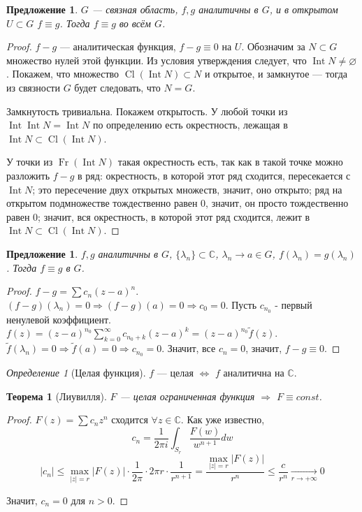 \documentclass[12pt]{article}
\renewcommand{\C}{\mathbb{C}}
\newcommand{\Int}{\operatorname{Int}}
\newcommand{\Cl}{\operatorname{Cl}}
\newcommand{\Fr}{\operatorname{Fr}}
\newcommand{\Ra}{\Rightarrow}
\renewcommand{\iff}{\Leftrightarrow}
\newcounter{cnt}
\theoremstyle{thmnote}
\newtheorem{theorem}[cnt]{Теорема}
\newtheorem{proposition}[cnt]{Предложение}
\theoremstyle{remark}
\theoremstyle{defnote}
\newtheorem{definition}[cnt]{Определение}
\begin{document}
\begin{proposition}
\label{nodensezeros}
    $G$ --- связная область, $f, g$ аналитичны в $G$, и в открытом $U \subset G$ $f \equiv g$. Тогда $f \equiv g$ во всём $G$.
\end{proposition}
\begin{proof}
    $f - g$ --- аналитическая функция, $f - g \equiv 0$ на $U$. Обозначим за $N \subset G$ множество нулей этой функции. Из условия утверждения следует, что $\Int N \neq \varnothing$. Покажем, что множество $\Cl(\Int N) \subset N$ и открытое, и замкнутое --- тогда из связности $G$ будет следовать, что $N = G$.

    Замкнутость тривиальна. Покажем открытость. У любой точки из $\Int \Int N = \Int N$ по определению есть окрестность, лежащая в $\Int N \subset \Cl(\Int N)$.
    
    У точки из $\Fr (\Int N)$ такая окрестность есть, так как в такой точке можно разложить $f - g$ в ряд: окрестность, в которой этот ряд сходится, пересекается с $\Int N$; это пересечение двух открытых множеств, значит, оно открыто; ряд на открытом подмножестве тождественно равен 0, значит, он просто тождественно равен 0; значит, вся окрестность, в которой этот ряд сходится, лежит в $\Int N \subset \Cl(\Int N)$.
\end{proof}

\begin{proposition}
    $f, g$ аналитичны в $G$, $\{\lambda_n\} \subset \C$, $\lambda_n \longrightarrow a \in G$, $f(\lambda_n) = g(\lambda_n)$. Тогда $f \equiv g$ в $G$.
\end{proposition}
\begin{proof}
    $f - g = \sum c_n (z - a)^n$. $(f-g)(\lambda_n) = 0 \Ra (f-g)(a) = 0 \Ra c_0 = 0$. Пусть $c_{n_0}$ - первый ненулевой коэффициент. $f(z) = (z - a)^{n_0} \sum_{k = 0}^{\infty} c_{n_0 + k} (z - a)^k = (z - a)^{n_0} \tilde{f}(z)$. $\tilde{f}(\lambda_n) = 0 \Ra \tilde{f}(a) = 0 \Ra c_{n_0} = 0$. Значит, все $c_n = 0$, значит, $f - g \equiv 0$.
\end{proof}

\begin{definition}[Целая функция]
    $f$ --- целая $\iff$ $f$ аналитична на $\C$.
\end{definition}

\begin{theorem}[Лиувилля]
\label{liuv}
    $F$ --- целая ограниченная функция $\Ra$ $F \equiv const$.
\end{theorem}
\begin{proof}
    $F(z) = \sum c_n z^n$ сходится $\forall z \in \C$. Как уже известно,
    \begin{equation*}
        c_n = \frac{1}{2 \pi i} \int_{S_r} \frac{F(w)}{w^{n+1}} dw
    \end{equation*}
    \begin{equation*}
        |c_n| \leq \underset{|z| = r}{\max} |F(z)| \cdot \frac{1}{2 \pi} \cdot 2 \pi r \cdot \frac{1}{r^{n+1}} = \frac{\underset{|z| = r}{\max} |F(z)|}{r^n} \leq \frac{c}{r^n} \underset{r \to +\infty}{\longrightarrow} 0
    \end{equation*}

    Значит, $c_n = 0$ для $n > 0$.
\end{proof}
\end{document}
